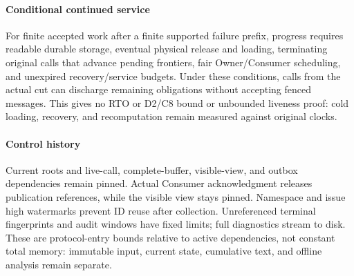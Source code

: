 \paragraph{Conditional continued service}
\label{prop:continued_service}
For finite accepted work after a finite supported failure prefix,
progress requires readable durable storage, eventual physical release
and loading, terminating original calls that advance pending frontiers,
fair Owner/Consumer scheduling, and unexpired recovery/service budgets.
Under these conditions, calls from the actual cut can discharge remaining
obligations without accepting fenced messages. This gives no RTO or
D2/C8 bound or unbounded liveness proof: cold loading, recovery, and
recomputation remain measured against original clocks.

\paragraph{Control history}
Current roots and live-call, complete-buffer, visible-view, and outbox
dependencies remain pinned. Actual Consumer acknowledgment releases
publication references, while the visible view stays pinned. Namespace
and issue high watermarks prevent ID reuse after collection. Unreferenced
terminal fingerprints and audit windows have fixed limits; full
diagnostics stream to disk. These are protocol-entry bounds relative to
active dependencies, not constant total memory: immutable input, current
state, cumulative text, and offline analysis remain separate.

